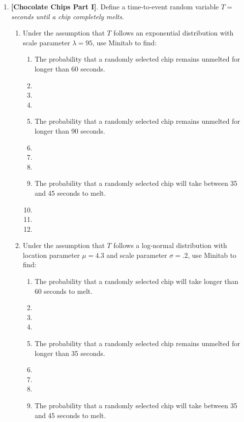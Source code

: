 





\vskip10pt

\begin{enumerate}

\item \textbf{[Chocolate Chips Part I]}. Define a time-to-event random variable $T=$ \textit{seconds until a chip completely melts}.
\begin{enumerate}
\item  Under  the assumption that $T$ follows an exponential distribution with scale parameter $\lambda=95$, use Minitab to find:
\begin{enumerate}
\item The probability that a randomly selected chip remains unmelted for longer than 60 seconds.
\item[]
\item[]
\item[]
\item The probability that a randomly selected chip remains unmelted for longer than 90 seconds.
\item[]
\item[]
\item[]
\item The probability that a randomly selected chip will take between 35 and 45 seconds to melt.
\item[]
\item[]
\item[]
\end{enumerate}
\item  Under  the assumption that $T$ follows a log-normal distribution with location parameter $\mu=4.3$ and scale parameter $\sigma=.2$, use Minitab to find:
\begin{enumerate}
\item The probability that a randomly selected chip will take longer than 60 seconds to melt.
\item[]
\item[]
\item[]
\item The probability that a randomly selected chip remains unmelted for longer than 35 seconds.
\item[]
\item[]
\item[]
\item The probability that a randomly selected chip will take between 35 and 45 seconds to melt.

\end{enumerate}
\end{enumerate}
\end{enumerate}

